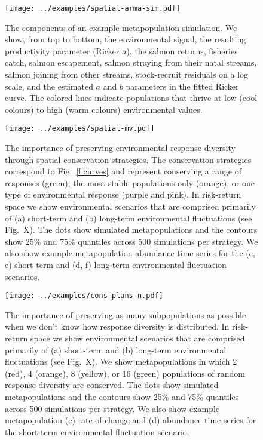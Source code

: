 \begin{figure}[htbp]
\centering
\texttt{[image: ../examples/spatial-arma-sim.pdf]}
\caption{The components of an example metapopulation simulation.  We show, from top to bottom, the environmental signal, the resulting productivity parameter (Ricker $a$), the salmon returns, fisheries catch, salmon escapement, salmon straying from their natal streams, salmon joining from other streams, stock-recruit residuals on a log scale, and the estimated $a$ and $b$ parameters in the fitted Ricker curve. The colored lines indicate populations that thrive at low (cool colours) to high (warm colours) environmental values.}
\label{f:sp-eg}
\end{figure}

\clearpage

\begin{figure}[htbp]
\centering
\texttt{[image: ../examples/spatial-mv.pdf]}
\caption{The importance of preserving environmental response diversity through spatial conservation strategies. The conservation strategies correspond to Fig.~\ref{f:curves} and represent conserving a range of responses (green), the most stable populations only (orange), or one type of environmental response (purple and pink).  In risk-return space we show environmental scenarios that are comprised primarily of (a) short-term and (b) long-term environmental fluctuations (see Fig.~X). The dots show simulated metapopulations and the contours show 25\% and 75\% quantiles across 500 simulations per strategy. We also show example metapopulation abundance time series for the (c, e) short-term and (d, f) long-term  environmental-fluctuation scenarios.}
\label{f:sp-mv}
\end{figure}

\clearpage

\begin{figure}[htbp]
\centering
\texttt{[image: ../examples/cons-plans-n.pdf]}
\caption{The importance of preserving as many subpopulations as possible when we don't know how response diversity is distributed. In risk-return space we show environmental scenarios that are comprised primarily of (a) short-term and (b) long-term environmental fluctuations (see Fig.~X). We show metapopulations in which 2 (red), 4 (orange), 8 (yellow), or 16 (green) populations of random response diversity are conserved. The dots show simulated metapopulations and the contours show 25\% and 75\% quantiles across 500 simulations per strategy. We also show example metapopulation (c) rate-of-change and (d) abundance time series for the short-term environmental-fluctuation scenario.}
\label{f:n-mv}
\end{figure}

\clearpage
